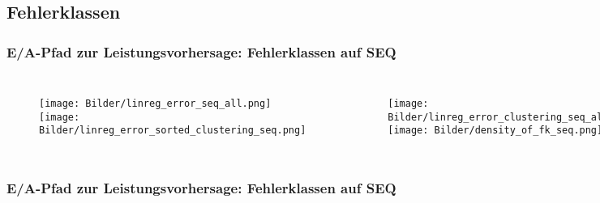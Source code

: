\documentclass{beamer}
\begin{document}
\subsection{Fehlerklassen}
\begin{frame}
\frametitle{E/A-Pfad zur Leistungsvorhersage: Fehlerklassen auf SEQ}
\begin{columns}
	\begin{figure}
		\texttt{[image: Bilder/linreg\_error\_seq\_all.png]}\\
		\texttt{[image: Bilder/linreg\_error\_sorted\_clustering\_seq.png]}
	\end{figure}
	\begin{figure}
		\texttt{[image: Bilder/linreg\_error\_clustering\_seq\_all.png]}\\
		\texttt{[image: Bilder/density\_of\_fk\_seq.png]}
	\end{figure}
\end{columns}
\end{frame}

\begin{frame}
\frametitle{E/A-Pfad zur Leistungsvorhersage: Fehlerklassen auf SEQ}
\begin{table}
\end{table}
\end{frame}
\end{document}
